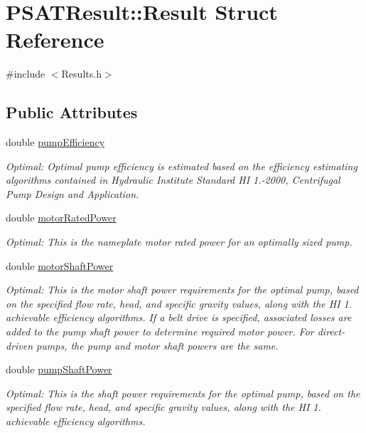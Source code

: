 \hypertarget{struct_p_s_a_t_result_1_1_result}{}\section{P\+S\+A\+T\+Result\+:\+:Result Struct Reference}
\label{struct_p_s_a_t_result_1_1_result}


{\ttfamily \#include $<$Results.\+h$>$}

\subsection*{Public Attributes}
\begin{DoxyCompactItemize}
\item 
double \hyperlink{struct_p_s_a_t_result_1_1_result_a6b194eedbd6d31390928e1b4feab922b}{pump\+Efficiency}
\begin{DoxyCompactList}\small\item\em Optimal\+: Optimal pump efficiency is estimated based on the efficiency estimating algorithms contained in Hydraulic Institute Standard HI 1.-\/2000, Centrifugal Pump Design and Application. \end{DoxyCompactList}\item 
double \hyperlink{struct_p_s_a_t_result_1_1_result_ae487ec5d7eed6f287f18b4ed15e1b639}{motor\+Rated\+Power}
\begin{DoxyCompactList}\small\item\em Optimal\+: This is the nameplate motor rated power for an optimally sized pump. \end{DoxyCompactList}\item 
double \hyperlink{struct_p_s_a_t_result_1_1_result_a75bfbaf59bbc736b53936069bcaf622a}{motor\+Shaft\+Power}
\begin{DoxyCompactList}\small\item\em Optimal\+: This is the motor shaft power requirements for the optimal pump, based on the specified flow rate, head, and specific gravity values, along with the HI 1. achievable efficiency algorithms. If a belt drive is specified, associated losses are added to the pump shaft power to determine required motor power. For direct-\/driven pumps, the pump and motor shaft powers are the same. \end{DoxyCompactList}\item 
double \hyperlink{struct_p_s_a_t_result_1_1_result_a6787157a580ee3755910e18e792a4dbf}{pump\+Shaft\+Power}
\begin{DoxyCompactList}\small\item\em Optimal\+: This is the shaft power requirements for the optimal pump, based on the specified flow rate, head, and specific gravity values, along with the HI 1. achievable efficiency algorithms. \end{DoxyCompactList}\item 

\end{DoxyCompactItemize}
